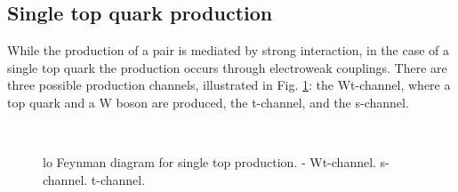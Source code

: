 \subsection{Single top quark production}

While the production of a \ttbar pair is mediated by strong interaction, in the case of a single top quark the production occurs through electroweak 
couplings. There are three possible production channels, illustrated in Fig. \ref{fig:single_top_prod}: the Wt-channel, where a top quark and a W boson are produced, the t-channel, and the s-channel. 

\begin{figure}[h]
\centering 
{}
 \\
\caption{\Gls{lo} Feynman diagram for single top production. - Wt-channel. 
 s-channel.  t-channel.}\label{fig:single_top_prod}
\end{figure}

